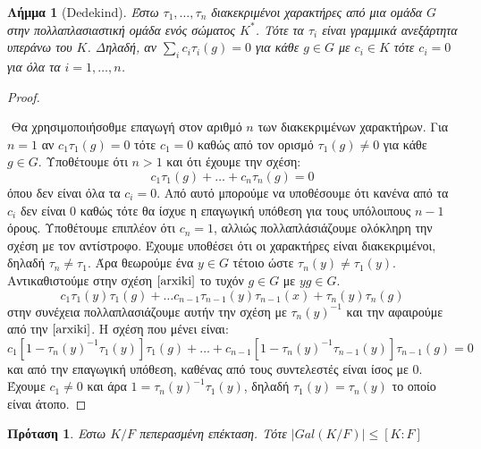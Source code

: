 \documentclass[oneside,a4paper]{article}
\newtheorem{lemma}{Λήμμα}
\newtheorem{prop}{Πρόταση}
\newcommand {\tl}{\textlatin}
\begin{document}
\begin{lemma}[\tl{Dedekind}]
	Έστω $\tau_1 , \ldots, \tau_n$ διακεκριμένοι χαρακτήρες από μια ομάδα $G$ στην πολλαπλασιαστική ομάδα ενός σώματος $K^*$. Τότε τα $\tau_i$ είναι γραμμικά ανεξάρτητα υπεράνω του $K$. Δηλαδή, αν $\sum\limits_i c_i \tau_i (g) = 0$ για κάθε $g \in G$ με $c_i \in K$ τότε $c_i = 0$ για όλα τα $i =1,\ldots,n$. 
\end{lemma}
\begin{proof} $ $
	
	$ $\newline
	Θα χρησιμοποιήσοθμε επαγωγή στον αριθμό $n$ των διακεκριμένων χαρακτήρων. Για $n=1$ αν $c_1 \tau_1 (g) = 0$ τότε $c_1 =0$ καθώς από τον ορισμό $\tau_1 (g) \neq 0 $ για κάθε $g \in G$. Υποθέτουμε ότι $n>1$ και ότι έχουμε την σχέση:
	\begin{equation}
		\label{arxiki}
		c_1 \tau_1 (g) + \ldots + c_n \tau_n (g) = 0
	\end{equation}
	όπου δεν είναι όλα τα $c_i = 0$. Από αυτό μπορούμε να υποθέσουμε ότι κανένα από τα $c_i$ δεν είναι $0$ καθώς τότε θα ίσχυε η επαγωγική υπόθεση για τους υπόλοιπους $n-1$ όρους. Υποθέτουμε επιπλέον ότι $c_n = 1$, αλλιώς πολλαπλάσιάζουμε ολόκληρη την σχέση με τον αντίστροφο. Έχουμε υποθέσει ότι οι χαρακτήρες είναι διακεκριμένοι, δηλαδή $\tau_n \neq \tau_1$. Άρα θεωρούμε ένα $y \in G$ τέτοιο ώστε $\tau_n (y) \neq \tau_1 (y)$. Αντικαθιστούμε στην σχέση $\ref{arxiki}$ το τυχόν $g \in G$ με $yg \in G$.
	$$c_1 \tau_1 (y) \tau_1 (g) + \ldots c_{n-1} \tau_{n-1} (y) \tau_{n-1} (x) + \tau_{n}(y) \tau_n (g)$$
	στην συνέχεια πολλαπλασιάζουμε αυτήν την σχέση με $\tau_n (y)^{-1}$ και την αφαιρούμε από την $\ref{arxiki}$. Η σχέση που μένει είναι:
	$$c_1 [1- \tau_n (y)^{-1}\tau_1 (y)] \tau_1 (g) + \ldots + c_{n-1} [1- \tau_n (y)^{-1}\tau_{n-1} (y)] \tau_{n-1} (g) = 0$$
	και από την επαγωγική υπόθεση, καθένας από τους συντελεστές είναι ίσος με $0$. Έχουμε $c_1 \neq 0$ και άρα $1 = \tau_n (y)^{-1} \tau_1 (y)$, δηλαδή $\tau_1 (y) = \tau_n (y)$ το οποίο είναι άτοπο. 
	
\end{proof}


\begin{prop}
	Εστω $K/F$ πεπερασμένη επέκταση. Τότε $|Gal(K/F)| \leq [K:F]$
\end{prop}
\end{document}
